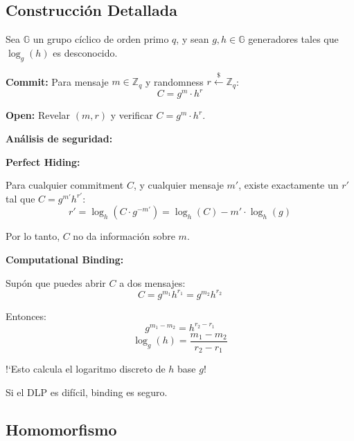 \documentclass[11pt,a4paper,twoside]{book}
\newcommand{\G}{\mathbb{G}}
\newcommand{\Z}{\mathbb{Z}}
\begin{document}
\subsection{Construcci\'on Detallada}

\begin{definition}
Sea $\G$ un grupo c\'iclico de orden primo $q$, y sean $g, h \in \G$ generadores tales que $\log_g(h)$ es desconocido.

\textbf{Commit:} Para mensaje $m \in \Z_q$ y randomness $r \xleftarrow{\$} \Z_q$:
\[ C = g^m \cdot h^r \]

\textbf{Open:} Revelar $(m, r)$ y verificar $C = g^m \cdot h^r$.
\end{definition}

\begin{mathnote}
\textbf{An\'alisis de seguridad:}

\textbf{Perfect Hiding:}

Para cualquier commitment $C$, y cualquier mensaje $m'$, existe exactamente un $r'$ tal que $C = g^{m'} h^{r'}$:
\[ r' = \log_h(C \cdot g^{-m'}) = \log_h(C) - m' \cdot \log_h(g) \]

Por lo tanto, $C$ no da informaci\'on sobre $m$.

\textbf{Computational Binding:}

Sup\'on que puedes abrir $C$ a dos mensajes:
\[ C = g^{m_1} h^{r_1} = g^{m_2} h^{r_2} \]

Entonces:
\[ g^{m_1 - m_2} = h^{r_2 - r_1} \]
\[ \log_g(h) = \frac{m_1 - m_2}{r_2 - r_1} \]

!`Esto calcula el logaritmo discreto de $h$ base $g$!

Si el DLP es dif\'icil, binding es seguro.
\end{mathnote}

\subsection{Homomorfismo}
\end{document}
